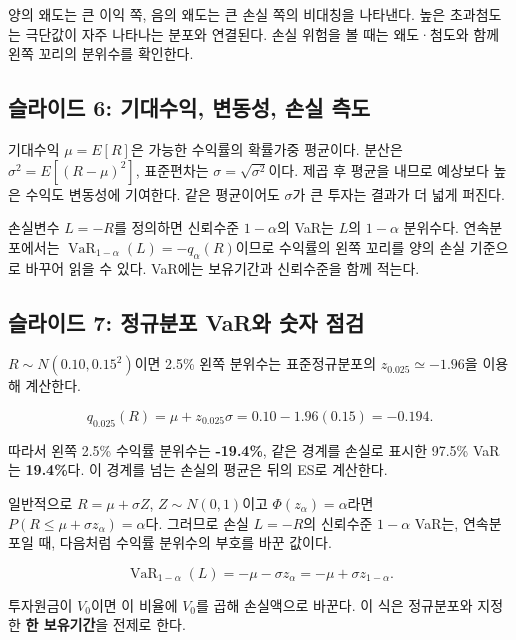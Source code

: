 \documentclass[11pt,a4paper]{article}
\begin{document}
양의 왜도는 큰 이익 쪽, 음의 왜도는 큰 손실 쪽의 비대칭을 나타낸다. 높은 초과첨도는 극단값이 자주 나타나는 분포와 연결된다. 손실 위험을 볼 때는 왜도·첨도와 함께 왼쪽 꼬리의 분위수를 확인한다.
\par

\subsection{슬라이드 6: 기대수익, 변동성, 손실 측도}

기대수익 $\mu=E[R]$은 가능한 수익률의 확률가중 평균이다. 분산은 $\sigma^2=E[(R-\mu)^2]$, 표준편차는 $\sigma=\sqrt{\sigma^2}$이다. 제곱 후 평균을 내므로 예상보다 높은 수익도 변동성에 기여한다. 같은 평균이어도 $\sigma$가 큰 투자는 결과가 더 넓게 퍼진다.
\par

손실변수 $L=-R$를 정의하면 신뢰수준 $1-\alpha$의 VaR는 $L$의 $1-\alpha$ 분위수다. 연속분포에서는 $\operatorname{VaR}_{1-\alpha}(L)=-q_\alpha(R)$이므로 수익률의 왼쪽 꼬리를 양의 손실 기준으로 바꾸어 읽을 수 있다. VaR에는 보유기간과 신뢰수준을 함께 적는다.
\par

\subsection{슬라이드 7: 정규분포 VaR와 숫자 점검}

$R\sim N(0.10,0.15^2)$이면 2.5\% 왼쪽 분위수는 표준정규분포의 $z_{0.025}\simeq-1.96$을 이용해 계산한다.
\par

\[
q_{0.025}(R)=\mu+z_{0.025}\sigma=0.10-1.96(0.15)=-0.194.
\]

따라서 왼쪽 2.5\% 수익률 분위수는 \textbf{-19.4\%}, 같은 경계를 손실로 표시한 97.5\% VaR는 \textbf{19.4\%}다. 이 경계를 넘는 손실의 평균은 뒤의 ES로 계산한다.
\par

일반적으로 $R=\mu+\sigma Z$, $Z\sim N(0,1)$이고 $\Phi(z_\alpha)=\alpha$라면 $P(R\le\mu+\sigma z_\alpha)=\alpha$다. 그러므로 손실 $L=-R$의 신뢰수준 $1-\alpha$ VaR는, 연속분포일 때, 다음처럼 수익률 분위수의 부호를 바꾼 값이다.
\par

\[
\operatorname{VaR}_{1-\alpha}(L)=-\mu-\sigma z_\alpha
=-\mu+\sigma z_{1-\alpha}.
\]

투자원금이 $V_0$이면 이 비율에 $V_0$를 곱해 손실액으로 바꾼다. 이 식은 정규분포와 지정한 \textbf{한 보유기간}을 전제로 한다.
\par
\end{document}
